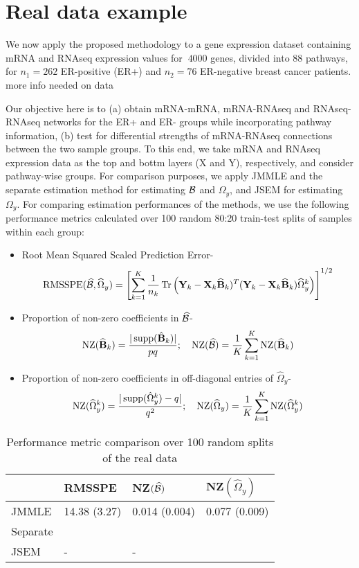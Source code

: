 \section{Real data example}
\label{sec:secreal}
We now apply the proposed methodology to a gene expression dataset containing mRNA and RNAseq expression values for $~4000$ genes, divided into 88 pathways, for $n_1 = 262$ ER-positive (ER+) and $n_2 = 76$ ER-negative breast cancer patients. {\colrbf more info needed on data}

Our objective here is to (a) obtain mRNA-mRNA, mRNA-RNAseq and RNAseq-RNAseq networks for the ER+ and ER- groups while incorporating pathway information, (b) test for differential strengths of mRNA-RNAseq connections between the two sample groups. To this end, we take mRNA and RNAseq expression data as the top and bottm layers (X and Y), respectively, and consider pathway-wise groups. For comparison purposes, we apply JMMLE and the separate estimation method \citet{LinEtal16} for estimating ${\cal{B}}$ and $\Omega_y$, and JSEM for estimating $\Omega_y$. For comparing estimation performances of the methods, we use the following performance metrics calculated over 100 random 80:20 train-test splits of samples within each group:
%
\begin{itemize}
\item Root Mean Squared Scaled Prediction Error-
%
$$ \text{RMSSPE}(\widehat {{\cal{B}}}, \widehat \Omega_y) = \left[
\sum_{k=1}^K \frac{1}{n_k} \operatorname*{Tr} \left({\mathbf{Y}}_k - {\mathbf{X}}_k \widehat {{\mathbf{B}}}_k)^T ({\mathbf{Y}}_k - {\mathbf{X}}_k \widehat {{\mathbf{B}}}_k)
\widehat\Omega_y^k \right)
\right]^{1/2} $$

\item Proportion of non-zero coefficients in $\widehat {{\cal{B}}}$-
%
$$ \text{NZ}(\widehat {{\mathbf{B}}}_k) = \frac{| \operatorname*{supp}(\hat {{\mathbf{B}}}_k) |}{pq}; \quad
\text{NZ}(\widehat {{\cal{B}}}) = \frac{1}{K} \sum_{k=1}^K \text{NZ}(\widehat {{\mathbf{B}}}_k) $$

\item Proportion of non-zero coefficients in off-diagonal entries of $\widehat \Omega_y$-
%
$$ \text{NZ}(\widehat \Omega_y^k) = \frac{| \operatorname*{supp}(\hat \Omega_y^k) - q|}{q^2}; \quad
\text{NZ}(\widehat \Omega_y) = \frac{1}{K} \sum_{k=1}^K \text{NZ}(\widehat \Omega_y^k) $$
\end{itemize}

\begin{table}[t]
\centering
    \begin{tabular}{llll}
    \hline
~        & RMSSPE        & NZ$(\widehat {{\cal{B}}})$  & NZ$(\widehat \Omega_y)$  \\\hline
JMMLE    & 14.38 (3.27) & 0.014 (0.004) & 0.077 (0.009) \\
Separate & ~            & ~             & ~             \\
JSEM     & -            & -             & ~             \\\hline
    \end{tabular}
    \caption{Performance metric comparison over 100 random splits of the real data}
    \label{table:real-compare}
\end{table}


